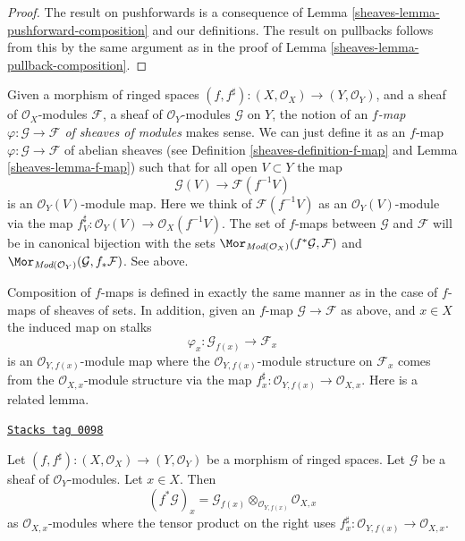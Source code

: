 \begin{proof}

The result on pushforwards is a consequence of Lemma
\ref{sheaves-lemma-pushforward-composition} and our definitions.
The result on pullbacks follows from this by the same
argument as in the proof of Lemma \ref{sheaves-lemma-pullback-composition}.
\end{proof}


Given a morphism of ringed spaces
$(f, f^\sharp) : (X, \mathcal{O}_X) \to (Y, \mathcal{O}_Y)$,
and a sheaf of $\mathcal{O}_X$-modules $\mathcal{F}$,
a sheaf of $\mathcal{O}_Y$-modules $\mathcal{G}$ on $Y$,
the notion of an {\it $f$-map $\varphi : \mathcal{G} \to \mathcal{F}$
of sheaves of modules} makes sense. We can just define
it as an $f$-map $\varphi : \mathcal{G} \to \mathcal{F}$
of abelian sheaves (see Definition \ref{sheaves-definition-f-map} and
Lemma \ref{sheaves-lemma-f-map}) such that for all open $V \subset Y$ the map
$$
\mathcal{G}(V) \longrightarrow \mathcal{F}(f^{-1}V)
$$
is an $\mathcal{O}_Y(V)$-module map. Here we think of
$\mathcal{F}(f^{-1}V)$ as an $\mathcal{O}_Y(V)$-module
via the map $f^\sharp_V : \mathcal{O}_Y(V) \to \mathcal{O}_X(f^{-1}V)$.
The set of $f$-maps between
$\mathcal{G}$ and $\mathcal{F}$ will be in canonical bijection
with the sets
$\Mor_{\textit{Mod}(\mathcal{O}_X)}(f^*\mathcal{G}, \mathcal{F})$
and
$\Mor_{\textit{Mod}(\mathcal{O}_Y)}(\mathcal{G}, f_*\mathcal{F})$.
See above.

\medskip\noindent
Composition of $f$-maps is defined in exactly the
same manner as in the case of $f$-maps of sheaves of
sets. In addition, given an $f$-map $\mathcal{G} \to \mathcal{F}$
as above, and $x \in X$ the induced map on stalks
$$
\varphi_x : \mathcal{G}_{f(x)} \longrightarrow \mathcal{F}_x
$$
is an $\mathcal{O}_{Y, f(x)}$-module map where the
$\mathcal{O}_{Y, f(x)}$-module structure on $\mathcal{F}_x$
comes from the $\mathcal{O}_{X, x}$-module structure via
the map $f^\sharp_x : \mathcal{O}_{Y, f(x)} \to \mathcal{O}_{X, x}$.
Here is a related lemma.

\begin{lemma}
\label{sheaves-lemma-stalk-pullback-modules}
\href{https://stacks.math.columbia.edu/tag/0098}{\texttt{Stacks tag 0098}}

Let $(f, f^\sharp) : (X, \mathcal{O}_X) \to (Y, \mathcal{O}_Y)$
be a morphism of ringed spaces.
Let $\mathcal{G}$ be a sheaf of $\mathcal{O}_Y$-modules.
Let $x \in X$. Then
$$
(f^*\mathcal{G})_x =
\mathcal{G}_{f(x)}
\otimes_{\mathcal{O}_{Y, f(x)}}
\mathcal{O}_{X, x}
$$
as $\mathcal{O}_{X, x}$-modules where the tensor product on the right
uses $f^\sharp_x : \mathcal{O}_{Y, f(x)} \to \mathcal{O}_{X, x}$.
\end{lemma}


